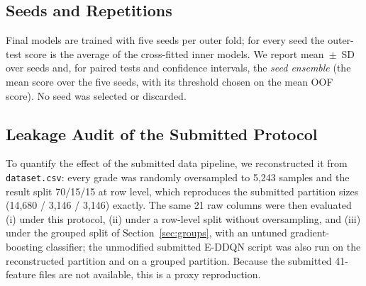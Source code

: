 \subsection{Seeds and Repetitions}
Final models are trained with five seeds per outer fold; for every seed the outer-test score is the average of the \nInner{} cross-fitted inner models. We report mean~$\pm$~SD over seeds and, for paired tests and confidence intervals, the \emph{seed ensemble} (the mean score over the five seeds, with its threshold chosen on the mean OOF score). No seed was selected or discarded.

\subsection{Leakage Audit of the Submitted Protocol}
To quantify the effect of the submitted data pipeline, we reconstructed it from \texttt{dataset.csv}: every grade was randomly oversampled to 5,243 samples and the result split 70/15/15 at row level, which reproduces the submitted partition sizes (14,680 / 3,146 / 3,146) exactly. The same 21 raw columns were then evaluated (i) under this protocol, (ii) under a row-level split without oversampling, and (iii) under the grouped split of Section~\ref{sec:groups}, with an untuned gradient-boosting classifier; the unmodified submitted E-DDQN script was also run on the reconstructed partition and on a grouped partition. Because the submitted 41-feature files are not available, this is a proxy reproduction.
